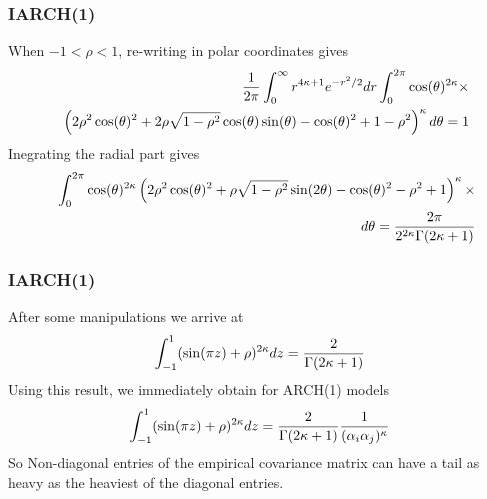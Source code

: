 \documentclass{beamer}
\begin{document}
\begin{frame}
  \frametitle{IARCH(1)}
  When $-1 < \rho < 1$, re-writing in polar coordinates gives
  \begin{eqnarray*}
    && {1 \over 2\pi} \int_0^{\infty} r^{4\kappa + 1} e^{-r^2 / 2} dr
    \int_{0}^{2\pi} \cos(\theta)^{2 \kappa} \times \\
    &&
    \left(
      2 \rho^2 \cos(\theta)^2
      + 2 \rho \sqrt{1 - \rho^2} \cos(\theta) \sin(\theta) - \cos(\theta)^2 + 1 - \rho^2
    \right)^\kappa d\theta = 1
  \end{eqnarray*}
  Inegrating the radial part gives
  \begin{eqnarray*}
    && \int_{0}^{2\pi}
    \cos(\theta)^{2\kappa}
    \left(
      2 \rho^2 \cos(\theta)^2 + \rho \sqrt{1 - \rho^2} \sin(2\theta) - \cos(\theta)^2 - \rho^2 + 1
    \right)^\kappa \times \\
    && d\theta
    = {2 \pi
      \over
      2^{2 \kappa} \Gamma(2\kappa + 1)
    }
  \end{eqnarray*}
\end{frame}

\begin{frame}
  \frametitle{IARCH(1)}
  After some manipulations we arrive at
  \begin{equation}
    \int_{-1}^1 (\sin(\pi z) + \rho)^{2\kappa} dz = {2 \over \Gamma(2\kappa + 1)}
  \end{equation}
  Using this result, we immediately obtain for ARCH(1) models
  \begin{equation*}
    \int_{-1}^1 (\sin(\pi z) + \rho)^{2\kappa} dz =
    {2 \over \Gamma(2\kappa + 1)}
    {1 \over (\alpha_{i} \alpha_{j})^\kappa}
  \end{equation*}
  So Non-diagonal entries of the empirical covariance matrix can have
  a tail as heavy as the heaviest of the diagonal entries.
\end{frame}
\end{document}
